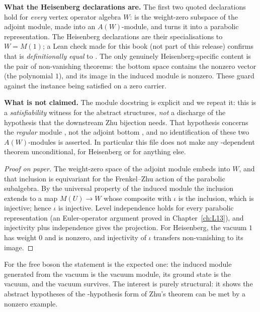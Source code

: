 \begin{dictionary}
\textbf{What the Heisenberg declarations are.} The first two quoted declarations hold for \emph{every}
vertex operator algebra $W$:  is the weight-zero subspace of the adjoint module,
made into an $A(W)$-module, and  turns it into a parabolic representation. The
Heisenberg declarations are their specialisations to $W=M(1)$; a Lean check made for this book (not part of
this release) confirms that
 is \emph{definitionally equal} to
. The only genuinely Heisenberg-specific content is the
pair of non-vanishing theorems: the bottom space contains the nonzero vector  (the polynomial
$1$), and its image in the induced module is nonzero. These guard against the instance being satisfied on a
zero carrier.

\textbf{What is not claimed.} The module docstring is explicit and we repeat it: this is a
\emph{satisfiability} witness for the abstract structures, \emph{not} a discharge of the hypothesis that the
downstream Zhu bijection needs. That hypothesis concerns the \emph{regular} module , not
the adjoint bottom , and no identification of these two $A(W)$-modules is asserted.
In particular this file does not make any -dependent theorem unconditional, for Heisenberg or for
anything else.
\end{dictionary}

\begin{proof}[Proof on paper]
The weight-zero space of the adjoint module embeds into $W$, and that inclusion is equivariant for the
Frenkel--Zhu action of the parabolic subalgebra. By the universal property of the induced module the inclusion
extends to a map $M(U)\to W$ whose composite with $\iota$ is the inclusion, which is injective; hence $\iota$ is
injective. Level independence holds for every parabolic representation (an Euler-operator argument proved in
Chapter~\ref{ch:L13}), and injectivity plus independence gives the projection. For Heisenberg, the vacuum $1$
has weight $0$ and is nonzero, and injectivity of $\iota$ transfers non-vanishing to its image.
\end{proof}

\begin{physics}
For the free boson the statement is the expected one: the induced module generated from the vacuum is the
vacuum module, its ground state is the vacuum, and the vacuum survives. The interest is purely structural: it
shows the abstract hypotheses of the -hypothesis form of Zhu's theorem can be met by a nonzero example.
\end{physics}

